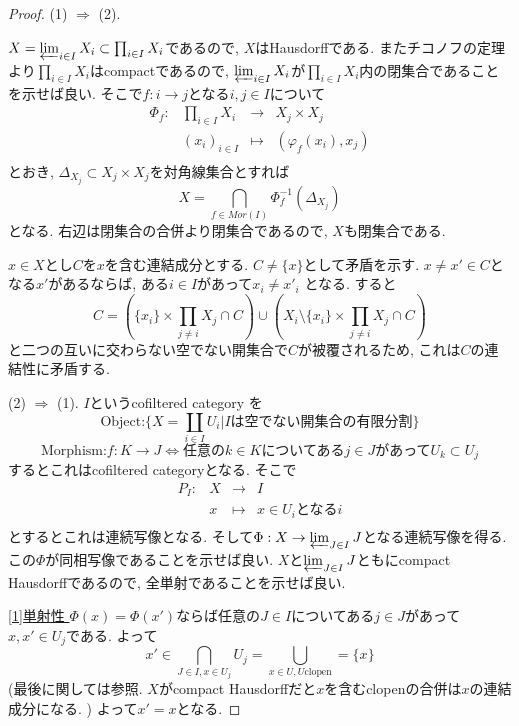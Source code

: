 \documentclass[dvipdfmx,a4paper,11pt]{article}
\theoremstyle{definition}
\begin{document}
\begin{proof}
(1) $\Rightarrow$ (2).

$X = \varprojlim_{i \in I} X_{i} \subset \prod_{i \in I} X_{i}$であるので, $X$はHausdorffである.
またチコノフの定理より$\prod_{i \in I} X_{i}$はcompactであるので, $\varprojlim_{i \in I} X_{i}$が$\prod_{i \in I} X_{i}$内の閉集合であることを示せば良い. 
そこで$f : i \to j$となる$i,j \in I$について
 $$
\begin{array}{cccc}
\Phi_{f}: &\prod_{i \in I} X_{i}& \rightarrow &X_j \times X_{j}  \\
&(x_{i})_{i \in I}& \longmapsto & (\varphi_{f}(x_{i}), x_j) \\
\end{array}
$$
とおき, $\Delta_{X_{j} }\subset X_{j} \times X_{j}$を対角線集合とすれば
$$
X = \bigcap_{f \in Mor(I)}\Phi_{f}^{-1}(\Delta_{X_{j} })
$$
となる. 右辺は閉集合の合併より閉集合であるので, $X$も閉集合である.

$x \in X$とし$C$を$x$を含む連結成分とする. $C \neq \{x\}$として矛盾を示す.
$x \neq x' \in C$となる$x'$があるならば, ある$i \in I$があって$x_{i} \neq x'_{i}$ となる.
すると
$$
C = \left(\{x_{i}\} \times \prod_{j \neq i} X_{j} \cap C\right) \cup \left(X_{i} \setminus \{x_{i}\} \times \prod_{j \neq i} X_{j} \cap C\right)
$$
と二つの互いに交わらない空でない開集合で$C$が被覆されるため, これは$C$の連結性に矛盾する.

(2) $\Rightarrow$ (1).
$I$というcofiltered category を
$$
\text{Object:} \{ X = \coprod_{i \in I} U_{i} | \text{$I$は空でない開集合の有限分割}\}
$$
$$
\text{Morphism:} f : K \to J \Leftrightarrow \text{任意の$k \in K$についてある$j \in J$があって$U_{k} \subset U_{j}$}
$$
するとこれはcofiltered categoryとなる. 
そこで
 $$
\begin{array}{cccc}
P_{I} : &X& \rightarrow &I  \\
&x& \longmapsto & \text{$x \in U_{i}$となる$i$} \\
\end{array}
$$
とするとこれは連続写像となる.
そして$\Phi : X \to \varprojlim_{J \in I} J$となる連続写像を得る.
この$\Phi$が同相写像であることを示せば良い.
$ X$と$ \varprojlim_{J \in I} J$ともにcompact Hausdorffであるので, 全単射であることを示せば良い.

\underline{[1]単射性 }
$\Phi(x) = \Phi(x')$ならば任意の$J \in I$についてある$j \in J$があって$x, x' \in U_{j}$である.
よって
$$
x' \in \bigcap_{J \in I, x \in U_{j}}U_{j} = \bigcup_{x \in U,  U \text{clopen}}=\{x\}
$$
(最後に関しては\cite[5.12.10]{Sta}参照. $X$がcompact Hausdorffだと$x$を含むclopenの合併は$x$の連結成分になる. )
よって$x' =x$となる.


\end{proof}
\end{document}
